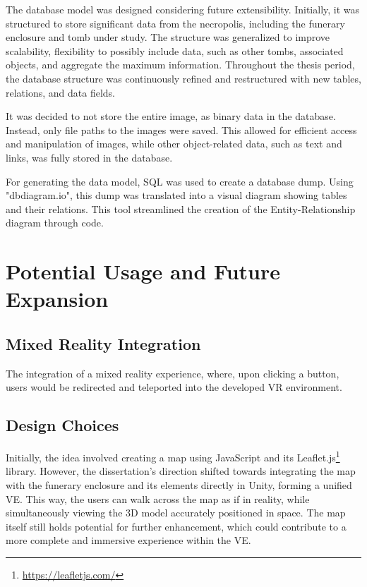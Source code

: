 The database model was designed considering future extensibility. Initially, it was structured to store significant data from the necropolis, including the funerary enclosure and tomb under study. The structure was generalized to improve scalability, flexibility to possibly include data, such as other tombs, associated objects, and aggregate the maximum information. 
Throughout the thesis period, the database structure was continuously refined and restructured with new tables, relations, and data fields.

It was decided to not store the entire image, as binary data in the database. Instead, only file paths to the images were saved. This allowed for efficient access and manipulation of images, while other object-related data, such as text and links, was fully stored in the database.

For generating the data model, SQL was used to create a database dump.
Using "dbdiagram.io", this dump was translated into a visual diagram showing tables and their relations. This tool streamlined the creation of the Entity-Relationship diagram through code.


\section{Potential Usage and Future Expansion}

\subsection{Mixed Reality Integration}
The integration of a mixed reality experience, where, upon clicking a button, users would be redirected and teleported into the developed VR environment. 

\subsection{Design Choices}
Initially, the idea involved creating a map using JavaScript and its Leaflet.js\footnote{\url{https://leafletjs.com/}} library. 
However, the dissertation's direction shifted towards integrating the map with the funerary enclosure and its elements directly in Unity, forming a unified \gls{VE}. This way, the users can walk across the map as if in reality, while simultaneously viewing the \gls{3D} model accurately positioned in space. 
The map itself still holds potential for further enhancement, which could contribute to a more complete and immersive experience within the \gls{VE}.

